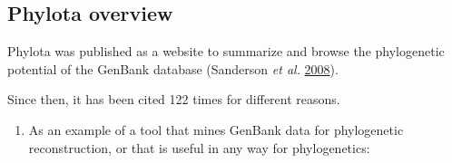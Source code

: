 \documentclass[]{article}
\providecommand{\tightlist}{%
  \setlength{\itemsep}{0pt}\setlength{\parskip}{0pt}}
\begin{document}
\hypertarget{phylota-overview}{%
\subsection{Phylota overview}\label{phylota-overview}}

Phylota was published as a website to summarize and browse the phylogenetic potential of the GenBank
database (Sanderson \emph{et al.} \protect\hyperlink{ref-sanderson2008phylota}{2008}).

Since then, it has been cited 122 times for different reasons.

\begin{enumerate}
\def\labelenumi{\arabic{enumi}.}
\tightlist
\item
  As an example of a tool that mines GenBank data for phylogenetic reconstruction,
  or that is useful in any way for phylogenetics:


\end{enumerate}
\end{document}
